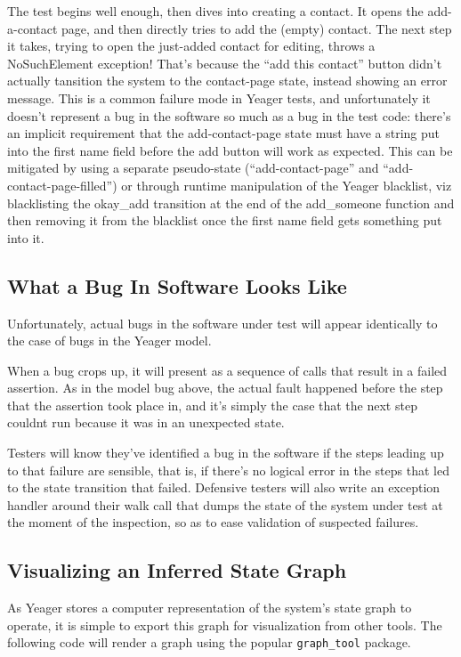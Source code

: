 The test begins well enough, then dives into creating a contact. It opens the add-a-contact page, and then directly tries to add the (empty) contact. The next step it takes, trying to open the just-added contact for editing, throws a NoSuchElement exception! That's because the  ``add this contact'' button didn't actually tansition the system to the contact-page state, instead showing an error message. This is a common failure mode in Yeager tests, and unfortunately it doesn't represent a bug in the software so much as a bug in the test code: there's an implicit requirement that the add-contact-page state must have a string put into the first name field before the add button will work as expected. This can be mitigated by using a separate pseudo-state (``add-contact-page'' and ``add-contact-page-filled'') or through runtime manipulation of the Yeager blacklist, viz blacklisting the okay\_add transition at the end of the add\_someone function and then removing it from the blacklist once the first name field gets something put into it.

\subsection{What a Bug In Software Looks Like}
Unfortunately, actual bugs in the software under test will appear identically to the case of bugs in the Yeager model.

When a bug crops up, it will present as a sequence of calls that result in a failed assertion. As in the model bug above, the actual fault happened before the step that the assertion took place in, and it's simply the case that the next step couldnt run because it was in an unexpected state.

Testers will know they've identified a bug in the software if the steps leading up to that failure are sensible, that is, if there's no logical error in the steps that led to the state transition that failed. Defensive testers will also write an exception handler around their walk call that dumps the state of the system under test at the moment of the inspection, so as to ease validation of suspected failures.

\subsection{Visualizing an Inferred State Graph}

As Yeager stores a computer representation of the system's state graph to operate, it is simple to export this graph for visualization from other tools. The following code will render a graph using the popular \texttt{graph\_tool} package.

